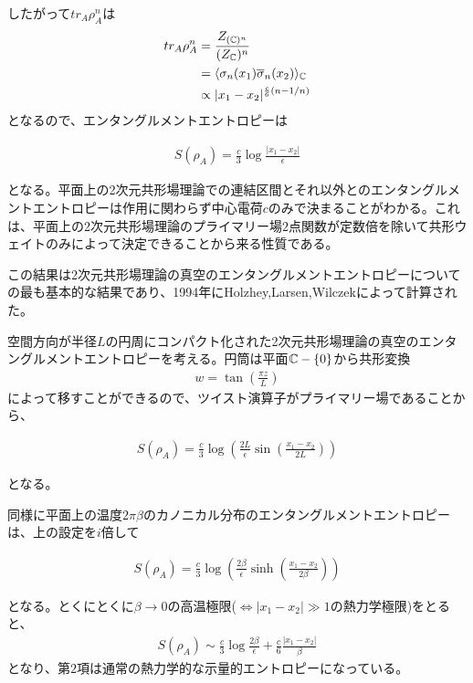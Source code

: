 したがって$tr_A \rho_A^n$は
\begin{align}
tr_A \rho_A^n&=\frac{Z_{(\mathbb{C})^n}}{(Z_{\mathbb{C}})^n}\\
&=\langle \sigma_n(x_1)\overline{\sigma}_n(x_2) \rangle_{\mathbb{C}}\\
&\propto |x_1-x_2|^{\frac{c}{6}\left(n-1/n\right)}
\end{align}
となるので、エンタングルメントエントロピーは
\begin{oframed}
\begin{align}\label{2dcftplaneEE}
S(\rho_A)=\frac{c}{3}\log\frac{|x_1-x_2|}{\epsilon}
\end{align}
\end{oframed}
となる。平面上の2次元共形場理論での連結区間とそれ以外とのエンタングルメントエントロピーは作用に関わらず中心電荷$c$のみで決まることがわかる。これは、平面上の2次元共形場理論のプライマリー場$2$点関数が定数倍を除いて共形ウェイトのみによって決定できることから来る性質である。

この結果は2次元共形場理論の真空のエンタングルメントエントロピーについての最も基本的な結果であり、1994年にHolzhey,Larsen,Wilczek\cite{Holzhey_1994}によって計算された。

空間方向が半径$L$の円周にコンパクト化された2次元共形場理論の真空のエンタングルメントエントロピーを考える。円筒は平面$\mathbb{C}-\{0\}$から共形変換
\begin{align}
w=\tan\left(\frac{\pi z}{L}\right)
\end{align}
によって移すことができるので、ツイスト演算子がプライマリー場であることから、
\begin{oframed}
\begin{align}\label{2dcftcylEE}
S(\rho_A)=\frac{c}{3}\log \left(\frac{2L}{\epsilon}\sin\left(\frac{x_1-x_2}{2L}\right)\right)
\end{align}
\end{oframed}
となる\cite{Calabrese:2004eu}。

同様に平面上の温度$2\pi\beta$のカノニカル分布のエンタングルメントエントロピーは、上の設定を$i$倍して
\begin{oframed}
\begin{align}\label{2dcftthermalEE}
S(\rho_{A})=\frac{c}{3}\log \left(\frac{2\beta}{\epsilon}\sinh\left(\frac{x_1-x_2}{2\beta}\right)\right)
\end{align}
\end{oframed}
となる。とくにとくに$\beta\to 0$の高温極限($\iff |x_1-x_2|\gg 1$の熱力学極限)をとると、
\begin{align}
S(\rho_{A})\sim\frac{c}{3}\log\frac{2\beta}{\epsilon}+\frac{c}{6}\frac{|x_1-x_2|}{\beta}
\end{align}
となり、第$2$項は通常の熱力学的な示量的エントロピーになっている。

